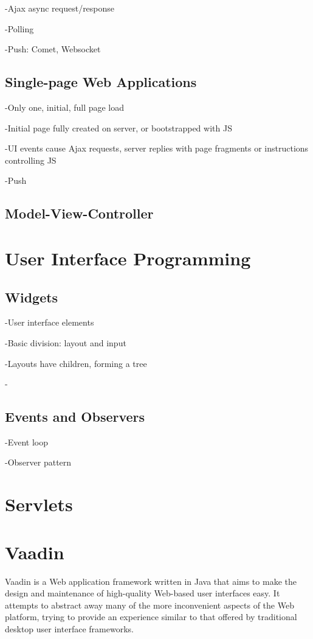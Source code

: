 -Ajax async request/response

-Polling

-Push: Comet, Websocket

\subsection{Single-page Web Applications}

-Only one, initial, full page load

-Initial page fully created on server, or bootstrapped with JS

-UI events cause Ajax requests, server replies with page fragments or instructions controlling JS

-Push

\subsection{Model-View-Controller}

\section{User Interface Programming}

\subsection{Widgets}

-User interface elements

-Basic division: layout and input

-Layouts have children, forming a tree

-

\subsection{Events and Observers}

-Event loop

-Observer pattern

\section{Servlets}

\section{Vaadin}

Vaadin is a Web application framework written in Java that aims to make the design and maintenance of high-quality Web-based user interfaces easy. It attempts to abstract away many of the more inconvenient aspects of the Web platform, trying to provide an experience similar to that offered by traditional desktop user interface frameworks.

